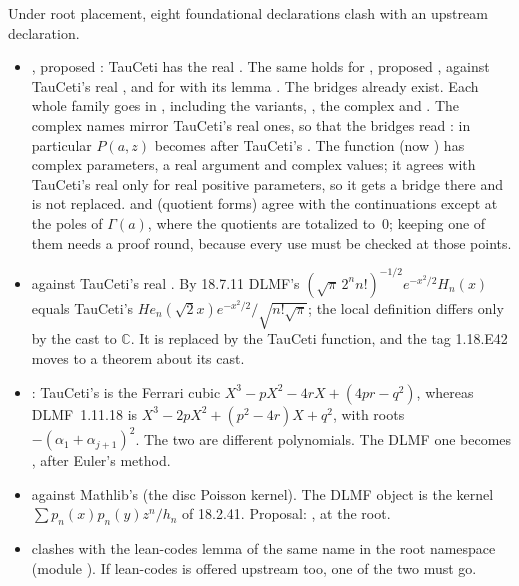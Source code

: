 \documentclass[11pt,a4paper]{article}
\begin{document}
Under root placement, eight foundational declarations clash with an upstream declaration.
\begin{itemize}
  \item {}, proposed : TauCeti has the
    real . The same holds for
    , proposed , against
    TauCeti's real , and for
     with its lemma . The
    bridges already exist. Each whole family goes in , including the
     variants, , the complex  and
    . The complex names mirror TauCeti's real ones, so that the
    bridges read : in particular $P(a,z)$ becomes
     after TauCeti's . The function
     (now ) has complex
    parameters, a real argument and complex values; it agrees with TauCeti's real
     only for real positive parameters, so it gets a bridge
    there and is not replaced.  and 
    (quotient forms) agree with the  continuations except at the poles of
    $\Gamma(a)$, where the quotients are totalized to~$0$; keeping one of them needs a proof
    round, because every use must be checked at those points.
  \item {} against TauCeti's real
    . By 18.7.11 DLMF's
    $(\sqrt\pi\,2^nn!)^{-1/2}e^{-x^2/2}H_n(x)$ equals TauCeti's
    $\mathit{He}_n(\sqrt2x)e^{-x^2/2}/\sqrt{n!\sqrt\pi}$; the local definition differs only by
    the cast to $\mathbb C$. It is replaced by the TauCeti function, and the tag 1.18.E42 moves
    to a theorem about its cast.
  \item {}: TauCeti's  is the
    Ferrari cubic $X^3-pX^2-4rX+(4pr-q^2)$, whereas DLMF~1.11.18 is
    $X^3-2pX^2+(p^2-4r)X+q^2$, with roots $-(\alpha_1+\alpha_{j+1})^2$. The two are different
    polynomials. The DLMF one becomes , after Euler's method.
  \item {} against Mathlib's 
    (the disc Poisson kernel). The DLMF object is the kernel
    $\sum p_n(x)p_n(y)z^n/h_n$ of 18.2.41. Proposal: , at the
    root.
  \item {} clashes with the lean-codes lemma of
    the same name in the root namespace (module ). If lean-codes is
    offered upstream too, one of the two must go.
\end{itemize}
\end{document}

